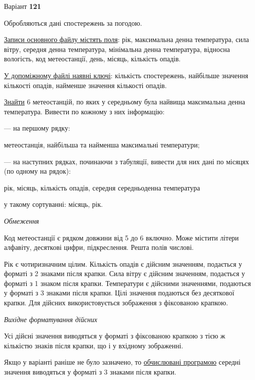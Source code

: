 \documentclass[11pt, ukrainian]{article}
\begin{document}
\par
\newpage
{\center Варіант  \No \textbf { 121 }\par}
\bigskip
Обробляються дані спостережень за погодою. 

\underline{Записи основного файлу містять поля}: рік, максимальна денна температура, сила вітру, середня денна температура, мінімальна денна температура, відносна вологість, код метеостанції, день, місяць, кількість опадів.

\underline{У допоміжному файлі наявні ключі}: кількість спостережень, найбільше значення кількості опадів, найменше значення кількості опадів.

\underline{Знайти} 6 метеостанцій, по яких у середньому була найвища максимальна денна температура. Вивести по кожному з них інформацію:\par
{\noindent}--- на першому рядку:\par
метеостанція, найбільша та найменша максимальні температури;

{\noindent}--- на наступних рядках, починаючи з табуляції, вивести для них дані по місяцях (по одному на рядок):\par
рік, місяць, кількість опадів, середня середньоденна температура

{\noindent}у такому сортуванні: місяць, рік.


\bigskip\textit{Обмеження}

Код метеостанції є рядком довжини від 5 до 6 включно.
Може містити літери алфавіту, десяткові цифри, підкреслення. Решта полів числові.

Рік є чотиризначним цілим.
Кількість опадів є дійсним значенням, подається у форматі з 2 знаками після крапки.
Сила вітру є дійсним значенням, подається у форматі з 1 знаком після крапки.
Температури є дійсними значеннями, подаються у форматі з 3 знаками після крапки.
Цілі значення подаються без десяткової крапки.
Для дійсних використовується зображення з фіксованою крапкою.

\textit{Вихідне форматування дійсних}

Усі дійсні значення виводяться у форматі з фіксованою крапкою з тією ж кількістю знаків після крапки, що і у вхідному зображенні.

Якщо у варіанті раніше не було зазначено, то \underline{обчислювані програмою} середні значення виводяться у форматі з 3 знаками після крапки.
\end{document}
